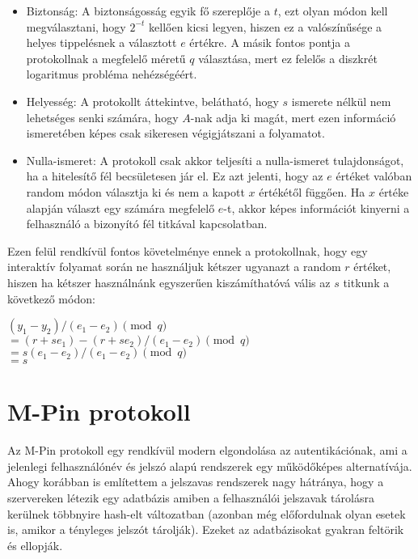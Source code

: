 \begin{itemize}
    \item Biztonság: A biztonságosság egyik fő szereplője a $t$, ezt olyan módon kell megválasztani, hogy $2^{-t}$ kellően kicsi legyen, hiszen ez a valószínűsége a helyes tippelésnek a választott $e$ értékre. A másik fontos pontja a protokollnak a megfelelő méretű $q$ választása, mert ez felelős a diszkrét logaritmus probléma nehézségéért.
    \item Helyesség: A protokollt áttekintve, belátható, hogy $s$ ismerete nélkül nem lehetséges senki számára, hogy $A$-nak adja ki magát, mert ezen információ ismeretében képes csak sikeresen végigjátszani a folyamatot.
    \item Nulla-ismeret: A protokoll csak akkor teljesíti a nulla-ismeret tulajdonságot, ha a hitelesítő fél becsületesen jár el. Ez azt jelenti, hogy az $e$ értéket valóban random módon választja ki és nem a kapott $x$ értékétől függően. Ha $x$ értéke alapján választ egy számára megfelelő $e$-t, akkor képes információt kinyerni a felhasználó a bizonyító fél titkával kapcsolatban.
\end{itemize}

\begin{minipage}{\textwidth}
Ezen felül rendkívül fontos követelménye ennek a protokollnak, hogy egy interaktív folyamat során ne használjuk kétszer ugyanazt a random $r$ értéket, hiszen ha kétszer használnánk egyszerűen kiszámíthatóvá vális az $s$ titkunk a következő módon:

$(y_1 - y_2) / (e_1 - e_2) \pmod{q}$ \\
$= (r + se_1) - (r + se_2) / (e_1 - e_2) \pmod{q}$ \\
$= s(e_1 - e_2) / (e_1 - e_2) \pmod{q}$ \\
$= s$
\end{minipage}

\section{M-Pin protokoll}

Az M-Pin protokoll \cite{MPin} egy rendkívül modern elgondolása az autentikációnak, ami a jelenlegi felhasználónév és jelszó alapú rendszerek egy működőképes alternatívája. Ahogy korábban is említettem a jelszavas rendszerek nagy hátránya, hogy a szervereken létezik egy adatbázis amiben a felhasználói jelszavak tárolásra kerülnek többnyire hash-elt változatban (azonban még előfordulnak olyan esetek is, amikor a tényleges jelszót tárolják). Ezeket az adatbázisokat gyakran feltörik és ellopják.

